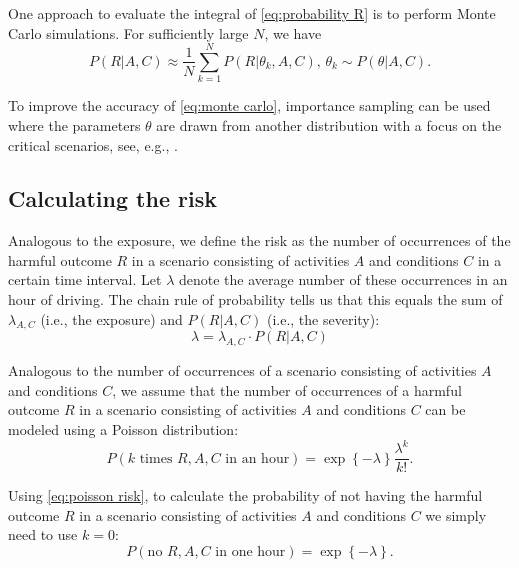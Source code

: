 One approach to evaluate the integral of \cref{eq:probability R} is to perform Monte Carlo simulations. For sufficiently large $N$, we have
\begin{equation} \label{eq:monte carlo}
	P(R|A,C) \approx \frac{1}{N} \sum_{k=1}^N P(R|\theta_k,A,C), \, \theta_k \sim P(\theta|A,C).
\end{equation}

To improve the accuracy of \cref{eq:monte carlo}, importance sampling can be used where the parameters $\theta$ are drawn from another distribution with a focus on the critical scenarios, see, e.g., \cite{deGelder2017assessment}.



\subsection{Calculating the risk}

Analogous to the exposure, we define the risk as the number of occurrences of the harmful outcome $R$ in a scenario consisting of activities $A$ and conditions $C$ in a certain time interval. Let $\lambda$ denote the average number of these occurrences in an hour of driving. The chain rule of probability tells us that this equals the sum of $\lambda_{A,C}$ (i.e., the exposure) and $P(R|A,C)$ (i.e., the severity):
\begin{equation} \label{eq:risk}
	\lambda = \lambda_{A,C} \cdot P(R|A,C)
\end{equation}

Analogous to the number of occurrences of a scenario consisting of activities $A$ and conditions $C$, we assume that the number of occurrences of a harmful outcome $R$ in a scenario consisting of activities $A$ and conditions $C$ can be modeled using a Poisson distribution:
\begin{equation} \label{eq:poisson risk}
	P(k\text{ times }R,A,C\text{ in an hour}) = \exp \left\{ -\lambda \right\} \frac{\lambda^k}{k!}.
\end{equation}

Using \cref{eq:poisson risk}, to calculate the probability of not having the harmful outcome $R$ in a scenario consisting of activities $A$ and conditions $C$ we simply need to use $k=0$:
\begin{equation} \label{eq:no harm}
	P(\text{no }R,A,C\text{ in one hour}) = \exp \left\{ -\lambda \right\}.
\end{equation}


